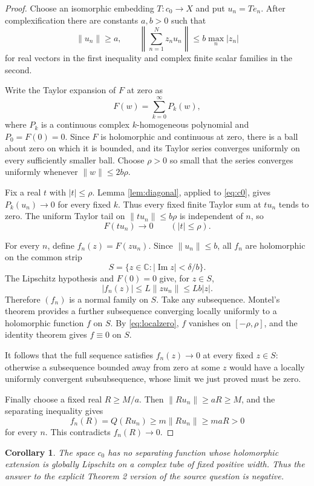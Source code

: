 \documentclass[11pt]{article}
\newtheorem{corollary}{Corollary}
\newcommand{\C}{\mathbb C}
\begin{document}
\begin{proof}
Choose an isomorphic embedding $T:c_0\to X$ and put $u_n=Te_n$.  After
complexification there are constants $a,b>0$ such that
\[
 \|u_n\|\ge a,
 \qquad
 \left\|\sum_{n=1}^N z_nu_n\right\|
 \le b\max_n|z_n|
 \tag{2}\label{eq:c0}
\]
for real vectors in the first inequality and complex finite scalar families
in the second.

Write the Taylor expansion of $F$ at zero as
\[
 F(w)=\sum_{k=0}^\infty P_k(w),
\]
where $P_k$ is a continuous complex $k$-homogeneous polynomial and
$P_0=F(0)=0$.  Since $F$ is holomorphic and continuous at zero, there is a
ball about zero on which it is bounded, and its Taylor series converges
uniformly on every sufficiently smaller ball.  Choose $\rho>0$ so small that
the series converges uniformly whenever $\|w\|\le2b\rho$.

Fix a real $t$ with $|t|\le\rho$.  Lemma \ref{lem:diagonal}, applied to
\eqref{eq:c0}, gives $P_k(u_n)\to0$ for every fixed $k$.  Thus every fixed
finite Taylor sum at $tu_n$ tends to zero.  The uniform Taylor tail on
$\|tu_n\|\le b\rho$ is independent of $n$, so
\[
 F(tu_n)\longrightarrow0
 \qquad (|t|\le\rho).
 \tag{3}\label{eq:localzero}
\]

For every $n$, define $f_n(z)=F(zu_n)$.  Since $\|u_n\|\le b$, all $f_n$ are
holomorphic on the common strip
\[
 S=\{z\in\C:|\operatorname{Im}z|<\delta/b\}.
\]
The Lipschitz hypothesis and $F(0)=0$ give, for $z\in S$,
\[
 |f_n(z)|\le L\|zu_n\|\le Lb|z|.
 \tag{4}\label{eq:normal}
\]
Therefore $(f_n)$ is a normal family on $S$.  Take any subsequence.  Montel's
theorem provides a further subsequence converging locally uniformly to a
holomorphic function $f$ on $S$.  By \eqref{eq:localzero}, $f$ vanishes on
$[-\rho,\rho]$, and the identity theorem gives $f\equiv0$ on $S$.

It follows that the full sequence satisfies $f_n(z)\to0$ at every fixed
$z\in S$: otherwise a subsequence bounded away from zero at some $z$ would
have a locally uniformly convergent subsubsequence, whose limit we just proved
must be zero.

Finally choose a fixed real $R\ge M/a$.  Then
$\|Ru_n\|\ge aR\ge M$, and the separating inequality gives
\[
 f_n(R)=Q(Ru_n)\ge m\|Ru_n\|\ge maR>0
\]
for every $n$.  This contradicts $f_n(R)\to0$.
\end{proof}

\begin{corollary}
The space $c_0$ has no separating function whose holomorphic extension is
globally Lipschitz on a complex tube of fixed positive width.  Thus the answer
to the explicit Theorem 2 version of the source question is negative.
\end{corollary}
\end{document}
